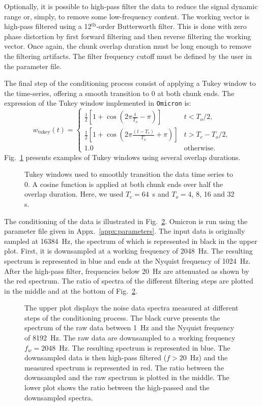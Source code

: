 Optionally, it is possible to high-pass filter the data to reduce the signal dynamic range or, simply, to remove some low-frequency content. The working vector is high-pass filtered using a 12$^{\mathrm{th}}$-order Butterworth filter. This is done with zero phase distortion by first forward filtering and then reverse filtering the working vector. Once again, the chunk overlap duration must be long enough to remove the filtering artifacts. The filter frequency cutoff must be defined by the user in the parameter file.

The final step of the conditioning process consist of applying a Tukey window to the time-series, offering a smooth transition to 0 at both chunk ends. The expression of the Tukey window implemented in \texttt{Omicron} is:
\begin{equation}
  w_{\mathrm{tukey}}(t) = 
  \begin{cases}
     \frac{1}{2}\left[ 1+\cos{\left(2\pi\frac{t}{T_o}-\pi\right)}\right]& t < T_o/2, \\
     \frac{1}{2}\left[ 1+\cos{\left(2\pi\frac{(t-T_c)}{T_o}+\pi\right)}\right]& t > T_c-T_o/2, \\
     1.0 & \mathrm{otherwise}.
  \end{cases}
\end{equation}
Fig.~\ref{fig:tukey} presents examples of Tukey windows using several overlap durations.
\begin{figure}
  \center
  \caption{Tukey windows used to smoothly transition the data time series to 0. A cosine function is applied at both chunk ends over half the overlap duration. Here, we used $T_c=64$~s and $T_o = 4$, 8, 16 and 32 s.}
  \label{fig:tukey}
\end{figure}

The conditioning of the data is illustrated in Fig.~\ref{fig:conditioning}. Omicron is run using the parameter file given in Appx.~\ref{appx:parameters}. The input data is originally sampled at 16384~Hz, the spectrum of which is represented in black in the upper plot. First, it is downsampled at a working frequency of 2048~Hz. The resulting spectrum is represented in blue and ends at the Nyquist frequency of 1024~Hz. After the high-pass filter, frequencies below 20~Hz are attenuated as shown by the red spectrum. The ratio of spectra of the different filtering steps are plotted in the middle and at the bottom of Fig.~\ref{fig:conditioning}.
\begin{figure}
  \center
  \caption{The upper plot displays the noise data spectra measured at different steps of the conditioning process. The black curve presents the spectrum of the raw data between 1~Hz and the Nyquist frequency of 8192~Hz. The raw data are downsampled to a working frequency $f_w=2048$~Hz. The resulting spectrum is represented in blue. The downsampled data is then high-pass filtered ($f>20$~Hz) and the measured spectrum is represented in red. The ratio between the downsampled and the raw spectrum is plotted in the middle. The lower plot shows the ratio between the high-passed and the downsampled spectra.}
  \label{fig:conditioning}
\end{figure}

